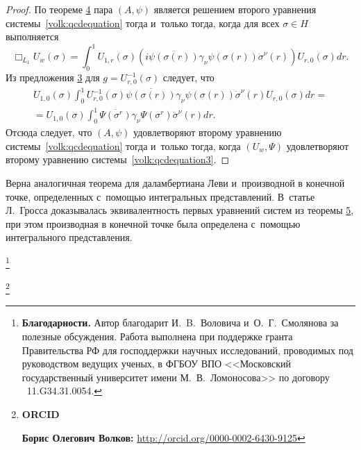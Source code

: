 \begin{proof}
По теореме \hyperlink{volk:th4}{4} пара $(A,\psi)$ является решением второго уравнения системы~\eqref{volk:qcdequation} тогда и~только  тогда, когда для всех $\sigma\in H$ выполняется
$$
\Box_{L_{1}}U_{w}(\sigma)=\int_0^1 U_{1,r}(\sigma)(i\overline{\psi(\sigma(r))}\gamma_\nu\psi (\sigma(r))\dot{\sigma}^\nu(r))U_{r, 0}(\sigma)dr.
$$
Из предложения \hyperlink{volk:pr3}{3} для $g=U^{-1}_{r, 0}(\sigma)$ следует, что
\begin{multline*}
U_{1, 0}(\sigma)\int_0^1 U^{-1}_{r, 0}(\sigma)\overline{\psi(\sigma(r))}\gamma_\nu\psi (\sigma(r))\dot{\sigma}^\nu(r)U_{r, 0}(\sigma)dr=\\
=U_{1, 0}(\sigma)\int_0^1\overline{\Psi(\sigma^r)}
\gamma_\nu\Psi(\sigma^r)\dot{\sigma}^\nu(r)dr.
\end{multline*}
Отсюда следует, что $(A,\psi)$ удовлетворяют второму уравнению  системы~\eqref{volk:qcdequation} тогда и~только тогда, когда  $(U_{w},\Psi)$ удовлетворяют второму уравнению  системы~\eqref{volk:qcdequation3}.
\end{proof}


\smallskip

Верна аналогичная теорема для даламбертиана Леви и~производной в конечной точке, определенных с~помощью интегральных представлений. 
В~статье~\cite{volkov:bib:Gross} Л.~Гросса доказывалась эквивалентность первых уравнений систем из  теоремы \hyperlink{volk:th5}{5}, при этом производная в конечной точке была определена с~помощью интегрального представления.





\thanks{{\bf Благодарности.} Автор благодарит И.~B.~Воловича и~О.~Г.~Смолянова за полезные обсуждения.
Работа выполнена при поддержке гранта Правительства РФ для господдержки научных исследований, проводимых под руководством ведущих ученых, в ФГБОУ ВПО <<Московский государственный университет имени М.~В.~Ломоносова>>
 по договору \textnumero~11.G34.31.0054.
}

\thanks{{\bf ORCID}

{\bf Борис Олегович Волков:} \url{http://orcid.org/0000-0002-6430-9125}

}


\newpage

\RusRef

